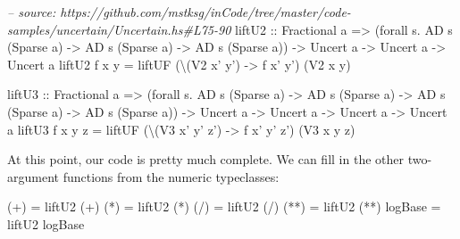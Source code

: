 \documentclass[]{article}
\newenvironment{Shaded}{}{}
\newcommand{\DataTypeTok}[1]{\textcolor[rgb]{0.56,0.13,0.00}{{#1}}}
\newcommand{\CommentTok}[1]{\textcolor[rgb]{0.38,0.63,0.69}{\textit{{#1}}}}
\newcommand{\OtherTok}[1]{\textcolor[rgb]{0.00,0.44,0.13}{{#1}}}
\newcommand{\FunctionTok}[1]{\textcolor[rgb]{0.02,0.16,0.49}{{#1}}}
\newcommand{\NormalTok}[1]{{#1}}
\begin{document}
\begin{Shaded}
\begin{Highlighting}[]
\CommentTok{-- source: https://github.com/mstksg/inCode/tree/master/code-samples/uncertain/Uncertain.hs#L75-90}
\NormalTok{liftU2}
\OtherTok{    ::} \DataTypeTok{Fractional} \NormalTok{a}
    \OtherTok{=>} \NormalTok{(forall s}\FunctionTok{.} \DataTypeTok{AD} \NormalTok{s (}\DataTypeTok{Sparse} \NormalTok{a) }\OtherTok{->} \DataTypeTok{AD} \NormalTok{s (}\DataTypeTok{Sparse} \NormalTok{a) }\OtherTok{->} \DataTypeTok{AD} \NormalTok{s (}\DataTypeTok{Sparse} \NormalTok{a))}
    \OtherTok{->} \DataTypeTok{Uncert} \NormalTok{a}
    \OtherTok{->} \DataTypeTok{Uncert} \NormalTok{a}
    \OtherTok{->} \DataTypeTok{Uncert} \NormalTok{a}
\NormalTok{liftU2 f x y }\FunctionTok{=} \NormalTok{liftUF (\textbackslash{}(}\DataTypeTok{V2} \NormalTok{x' y') }\OtherTok{->} \NormalTok{f x' y') (}\DataTypeTok{V2} \NormalTok{x y)}

\NormalTok{liftU3}
\OtherTok{    ::} \DataTypeTok{Fractional} \NormalTok{a}
    \OtherTok{=>} \NormalTok{(forall s}\FunctionTok{.} \DataTypeTok{AD} \NormalTok{s (}\DataTypeTok{Sparse} \NormalTok{a) }\OtherTok{->} \DataTypeTok{AD} \NormalTok{s (}\DataTypeTok{Sparse} \NormalTok{a) }\OtherTok{->} \DataTypeTok{AD} \NormalTok{s (}\DataTypeTok{Sparse} \NormalTok{a) }\OtherTok{->} \DataTypeTok{AD} \NormalTok{s (}\DataTypeTok{Sparse} \NormalTok{a))}
    \OtherTok{->} \DataTypeTok{Uncert} \NormalTok{a}
    \OtherTok{->} \DataTypeTok{Uncert} \NormalTok{a}
    \OtherTok{->} \DataTypeTok{Uncert} \NormalTok{a}
    \OtherTok{->} \DataTypeTok{Uncert} \NormalTok{a}
\NormalTok{liftU3 f x y z }\FunctionTok{=} \NormalTok{liftUF (\textbackslash{}(}\DataTypeTok{V3} \NormalTok{x' y' z') }\OtherTok{->} \NormalTok{f x' y' z') (}\DataTypeTok{V3} \NormalTok{x y z)}
\end{Highlighting}
\end{Shaded}

At this point, our code is pretty much complete. We can fill in the
other two-argument functions from the numeric typeclasses:

\begin{Shaded}
\begin{Highlighting}[]
\NormalTok{(}\FunctionTok{+}\NormalTok{)     }\FunctionTok{=} \NormalTok{liftU2 (}\FunctionTok{+}\NormalTok{)}
\NormalTok{(}\FunctionTok{*}\NormalTok{)     }\FunctionTok{=} \NormalTok{liftU2 (}\FunctionTok{*}\NormalTok{)}
\NormalTok{(}\FunctionTok{/}\NormalTok{)     }\FunctionTok{=} \NormalTok{liftU2 (}\FunctionTok{/}\NormalTok{)}
\NormalTok{(}\FunctionTok{**}\NormalTok{)    }\FunctionTok{=} \NormalTok{liftU2 (}\FunctionTok{**}\NormalTok{)}
\NormalTok{logBase }\FunctionTok{=} \NormalTok{liftU2 logBase}
\end{Highlighting}
\end{Shaded}
\end{document}
